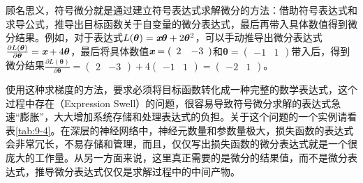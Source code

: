 \vspace{0.5em}

\parinterval 顾名思义，符号微分就是通过建立符号表达式求解微分的方法：借助符号表达式和求导公式，推导出目标函数关于自变量的微分表达式，最后再带入具体数值得到微分结果。例如，对于表达式$ L({\bm \theta})={\textbf{\em x}}{\bm \theta}+2{\bm \theta}^2 $，可以手动推导出微分表达式$ \frac{\partial L({\bm \theta})}{\partial {\bm \theta}}=\textbf{\em x}+4{\bm \theta}  $，最后将具体数值$ \textbf{\em x} = {(\begin{array}{cc} 2 & -3\end{array})} $和$ {\bm \theta} = {(\begin{array}{cc} -1 & 1\end{array})} $带入后，得到微分结果$\frac{\partial L({\bm \theta})}{\partial {\bm \theta}}= {(\begin{array}{cc} 2 & -3\end{array})}+4{(\begin{array}{cc} -1 & 1\end{array})}= {(\begin{array}{cc} -2 & 1\end{array})}$。

\parinterval  使用这种求梯度的方法，要求必须将目标函数转化成一种完整的数学表达式，这个过程中存在{\small{}}（Expression Swell）的问题，很容易导致符号微分求解的表达式急速“膨胀”，大大增加系统存储和处理表达式的负担。关于这个问题的一个实例请看表\ref{tab:9-4}。在深层的神经网络中，神经元数量和参数量极大，损失函数的表达式会非常冗长，不易存储和管理，而且，仅仅写出损失函数的微分表达式就是一个很庞大的工作量。从另一方面来说，这里真正需要的是微分的结果值，而不是微分表达式，推导微分表达式仅仅是求解过程中的中间产物。

